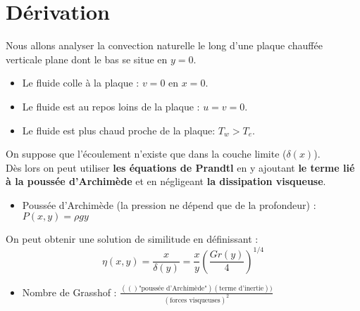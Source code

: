 \section{Dérivation}

\noindent Nous allons analyser la convection naturelle le long d'une plaque chauffée verticale plane dont le bas se situe en $y=0$.

\begin{itemize}
  \item Le fluide colle à la plaque : $v = 0$ en $x = 0$.
  \item Le fluide est au repos loins de la plaque : $u = v = 0$.
  \item Le fluide est plus chaud proche de la plaque: $T_w > T_e$.
\end{itemize}

\noindent On suppose que l'écoulement n'existe que dans la couche limite ($\delta(x)$). \\ 
Dès lors on peut utiliser \textbf{les équations de Prandtl} en y ajoutant \textbf{le terme lié à la poussée d'Archimède} et en négligeant \textbf{la dissipation visqueuse}.

\begin{itemize}
  \item Poussée d'Archimède (la pression ne dépend que de la profondeur) : $P(x, y) = \rho g y$
\end{itemize}

\noindent On peut obtenir une solution de similitude en définissant :
\begin{equation}
  \eta(x,y) = \frac{x}{\delta(y)} = \frac{x}{y} \left( \frac{Gr(y)}{4} \right)^{1/4}
\end{equation}

\begin{itemize}
  \item Nombre de Grasshof : $\frac{(()\text{"poussée d'Archimède"})(\text{terme d'inertie}))}{(\text{forces visqueuses})^2}$
\end{itemize}

\begin{center}
\end{center}

